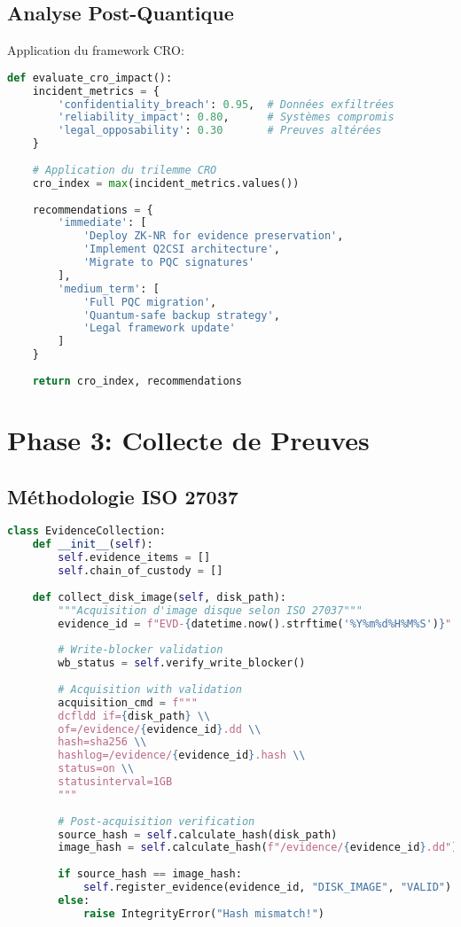 \subsection{Analyse Post-Quantique}
Application du framework CRO:

\begin{lstlisting}[language=Python, caption=Évaluation CRO de l'incident]
def evaluate_cro_impact():
    incident_metrics = {
        'confidentiality_breach': 0.95,  # Données exfiltrées
        'reliability_impact': 0.80,      # Systèmes compromis
        'legal_opposability': 0.30       # Preuves altérées
    }
    
    # Application du trilemme CRO
    cro_index = max(incident_metrics.values())
    
    recommendations = {
        'immediate': [
            'Deploy ZK-NR for evidence preservation',
            'Implement Q2CSI architecture',
            'Migrate to PQC signatures'
        ],
        'medium_term': [
            'Full PQC migration',
            'Quantum-safe backup strategy',
            'Legal framework update'
        ]
    }
    
    return cro_index, recommendations
\end{lstlisting}

\section{Phase 3: Collecte de Preuves}
\subsection{Méthodologie ISO 27037}
\begin{lstlisting}[language=Python, caption=Acquisition d'image disque selon ISO 27037]
class EvidenceCollection:
    def __init__(self):
        self.evidence_items = []
        self.chain_of_custody = []
    
    def collect_disk_image(self, disk_path):
        """Acquisition d'image disque selon ISO 27037"""
        evidence_id = f"EVD-{datetime.now().strftime('%Y%m%d%H%M%S')}"
        
        # Write-blocker validation
        wb_status = self.verify_write_blocker()
        
        # Acquisition with validation
        acquisition_cmd = f"""
        dcfldd if={disk_path} \\
        of=/evidence/{evidence_id}.dd \\
        hash=sha256 \\
        hashlog=/evidence/{evidence_id}.hash \\
        status=on \\
        statusinterval=1GB
        """
        
        # Post-acquisition verification
        source_hash = self.calculate_hash(disk_path)
        image_hash = self.calculate_hash(f"/evidence/{evidence_id}.dd")
        
        if source_hash == image_hash:
            self.register_evidence(evidence_id, "DISK_IMAGE", "VALID")
        else:
            raise IntegrityError("Hash mismatch!")
\end{lstlisting}

